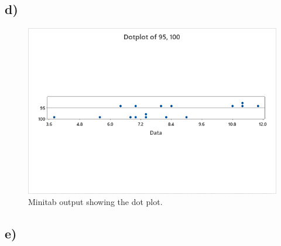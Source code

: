 \documentclass{article}
\begin{document}
\subsection*{d)}
\begin{figure}[h]
    \centering
    \includegraphics[width=.7\textwidth]{./hw_1/images/5_c.png}
    \caption{Minitab output showing the dot plot.}
    \label{fig:4_a}
\end{figure}
\subsection*{e)}
\end{document}
